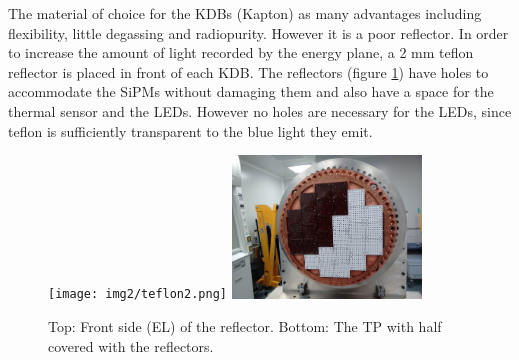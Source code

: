 The material of choice for the KDBs (Kapton) as many advantages including flexibility, little degassing and radiopurity. However it is a poor reflector. In order to increase the amount of light recorded by the energy plane, a 2 mm teflon reflector is placed in front of each KDB. The reflectors (figure \ref{fig:reflector}) have holes to accommodate the SiPMs without damaging them and also have a space for the thermal sensor and the LEDs. However no holes are necessary for the LEDs, since teflon is sufficiently transparent to the blue light they emit. 
\begin{figure}[hpt!]
\centering
\texttt{[image: img2/teflon2.png]}
\includegraphics[width=0.45\textwidth]{img2/HalfAndHalf.png}

\caption{Top: Front side (EL) of the reflector. Bottom: The TP with half covered with the reflectors.}
\label{fig:reflector}
\end{figure}


